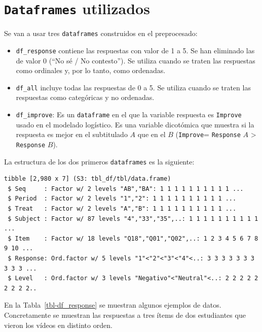 \documentclass[
  12pt,
  a4paper,
  extrafontsizes,
  onecolumn,
  openright,
  table]{memoir}
\providecommand{\tightlist}{%
  \setlength{\itemsep}{0pt}\setlength{\parskip}{0pt}}\usepackage{longtable,booktabs,array}
\begin{document}
\normalsize

\hypertarget{dataframes-utilizados}{%
\section{\texorpdfstring{\texttt{Dataframes}
utilizados}{Dataframes utilizados}}\label{dataframes-utilizados}}

Se van a usar tres \texttt{dataframes} construidos en el preprocesado:

\begin{itemize}
\tightlist
\item
  \texttt{df\_response} contiene las respuestas con valor de 1 a 5. Se
  han eliminado las de valor 0 (\enquote{No sé / No contesto}). Se
  utiliza cuando se traten las respuestas como ordinales y, por lo
  tanto, como ordenadas.
\item
  \texttt{df\_all} incluye todas las respuestas de 0 a 5. Se utiliza
  cuando se traten las respuestas como categóricas y no ordenadas.
\item
  \texttt{df\_improve}: Es un \texttt{dataframe} en el que la variable
  respuesta es \texttt{Improve} usado en el modelado logístico. Es una
  variable dicotómica que muestra si la respuesta es mejor en el
  subtitulado \(A\) que en el \(B\) (\texttt{Improve}= \texttt{Response}
  \(A\) \textgreater{} \texttt{Response} \(B\)).
\end{itemize}

La estructura de los dos primeros \texttt{dataframes} es la siguiente:

\begin{verbatim}
tibble [2,980 x 7] (S3: tbl_df/tbl/data.frame)
 $ Seq     : Factor w/ 2 levels "AB","BA": 1 1 1 1 1 1 1 1 1 1 ...
 $ Period  : Factor w/ 2 levels "1","2": 1 1 1 1 1 1 1 1 1 1 ...
 $ Treat   : Factor w/ 2 levels "A","B": 1 1 1 1 1 1 1 1 1 1 ...
 $ Subject : Factor w/ 87 levels "4","33","35",..: 1 1 1 1 1 1 1 1 1 1 ...
 $ Item    : Factor w/ 18 levels "Q18","Q01","Q02",..: 1 2 3 4 5 6 7 8 9 10 ...
 $ Response: Ord.factor w/ 5 levels "1"<"2"<"3"<"4"<..: 3 3 3 3 3 3 3 3 3 3 ...
 $ Level   : Ord.factor w/ 3 levels "Negativo"<"Neutral"<..: 2 2 2 2 2 2 2 2 2..
\end{verbatim}

En la Tabla~\ref{tbl-df_response} se muestran algunos ejemplos de datos.
Concretamente se muestran las respuestas a tres ítems de dos estudiantes
que vieron los vídeos en distinto orden.

\clearpage
\end{document}
